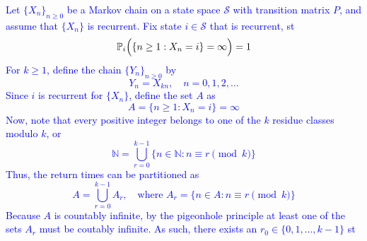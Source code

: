 \documentclass{article}
\begin{document}
\begin{enumerate}
%
\textcolor{blue}{Let $\{X_n\}_{n\ge 0}$ be a Markov chain on a state space $\mathcal{S}$ with transition matrix $P$, and assume that $\{X_n\}$ is recurrent. Fix state $i\in\mathcal{S}$ that is recurrent, st
\[
\mathbb{P}_i\Bigl(\{n\ge 1 : X_n = i\} =\infty \Bigr)=1
\]
For $k\ge 1$, define the chain $\{Y_n\}_{n\ge 0}$ by
\[
Y_n=X_{kn},\quad n=0,1,2,\dots
\]
Since $i$ is recurrent for $\{X_n\}$, define the set $A$ as
\[
A=\{n\ge 1 : X_n=i\}=\infty
\]
Now, note that every positive integer belongs to one of the $k$ residue classes modulo $k$, or
\[
\mathbb{N}=\bigcup_{r=0}^{k-1}\{n\in\mathbb{N} : n\equiv r\pmod{k}\}
\]
Thus, the return times can be partitioned as
\[
A=\bigcup_{r=0}^{k-1}A_r,\quad \text{where } A_r=\{n\in A : n\equiv r\pmod{k}\}
\]
Because $A$ is countably infinite, by the pigeonhole principle at least one of the sets $A_r$ must be coutably infinite. As such, there exists an $r_0\in\{0,1,\dots,k-1\}$ st
}
\end{enumerate}
\end{document}
